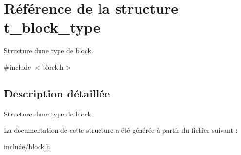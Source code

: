 \hypertarget{structt__block__type}{}\section{Référence de la structure t\+\_\+block\+\_\+type}
\label{structt__block__type}


Structure d\textquotesingle{}une type de block.  




{\ttfamily \#include $<$block.\+h$>$}



\subsection{Description détaillée}
Structure d\textquotesingle{}une type de block. 

La documentation de cette structure a été générée à partir du fichier suivant \+:\begin{DoxyCompactItemize}
\item 
include/\hyperlink{block_8h}{block.\+h}\end{DoxyCompactItemize}
